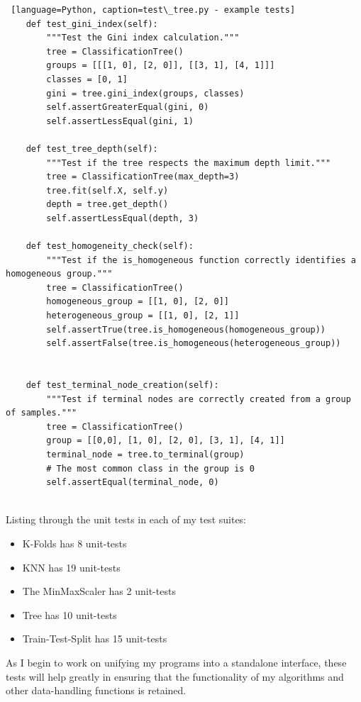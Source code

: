 \documentclass[letterpaper,10pt]{article}
\begin{document}
\begin{lstlisting} [language=Python, caption=test\_tree.py - example tests]
    def test_gini_index(self):
        """Test the Gini index calculation."""
        tree = ClassificationTree()
        groups = [[[1, 0], [2, 0]], [[3, 1], [4, 1]]]
        classes = [0, 1]
        gini = tree.gini_index(groups, classes)
        self.assertGreaterEqual(gini, 0)
        self.assertLessEqual(gini, 1)
    
    def test_tree_depth(self):
        """Test if the tree respects the maximum depth limit."""
        tree = ClassificationTree(max_depth=3)
        tree.fit(self.X, self.y)
        depth = tree.get_depth()
        self.assertLessEqual(depth, 3)

    def test_homogeneity_check(self):
        """Test if the is_homogeneous function correctly identifies a homogeneous group."""
        tree = ClassificationTree()
        homogeneous_group = [[1, 0], [2, 0]]
        heterogeneous_group = [[1, 0], [2, 1]]
        self.assertTrue(tree.is_homogeneous(homogeneous_group))
        self.assertFalse(tree.is_homogeneous(heterogeneous_group))


    def test_terminal_node_creation(self):
        """Test if terminal nodes are correctly created from a group of samples."""
        tree = ClassificationTree()
        group = [[0,0], [1, 0], [2, 0], [3, 1], [4, 1]]
        terminal_node = tree.to_terminal(group)
        # The most common class in the group is 0
        self.assertEqual(terminal_node, 0)
      
\end{lstlisting}

Listing through the unit tests in each of my test suites:
\begin{itemize}
    \item K-Folds has 8 unit-tests
    \item KNN has 19 unit-tests
    \item The MinMaxScaler has 2 unit-tests
    \item Tree has 10 unit-tests
    \item Train-Test-Split has 15 unit-tests
\end{itemize}

As I begin to work on unifying my programs into a standalone interface, these tests will help greatly in ensuring that the functionality of my algorithms and other data-handling functions is retained. \par
\end{document}
